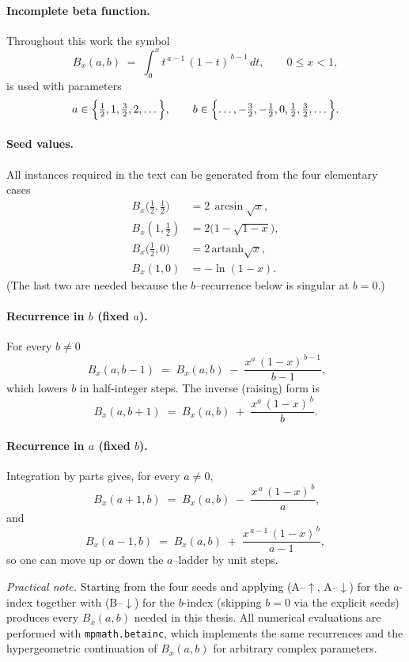 
\paragraph{Incomplete beta function.}
Throughout this work the symbol
\[
  B_x(a,b)\;=\;\int_{0}^{x} t^{\,a-1}\,(1-t)^{\,b-1}\,dt,
  \qquad 0\le x<1,
\]
is used with parameters
\[
  a\in\Bigl\{\tfrac12,1,\tfrac32,2,\dots\Bigr\}, 
  \qquad 
  b\in\Bigl\{\dots,-\tfrac32,-\tfrac12,0,\tfrac12,\tfrac32,\dots\Bigr\}.
\]

\paragraph{Seed values.}
All instances required in the text can be generated from the four
elementary cases
\[
\boxed{
  \begin{aligned}
    B_x\!\bigl(\tfrac12,\tfrac12\bigr) &= 2\,\arcsin\!\sqrt{x},\\[4pt]
    B_x(1,\tfrac12)                   &= 2\bigl(1-\sqrt{1-x}\bigr),\\[4pt]
    B_x\!\bigl(\tfrac12,0\bigr)       &= 2\,\mathrm{artanh}\!\sqrt{x},\\[4pt]
    B_x(1,0)                          &= -\ln(1-x).
  \end{aligned}}
\]
(The last two are needed because the $b$–recurrence below is singular
at $b=0$.)

\paragraph{Recurrence in $b$ (fixed $a$).}
For every $b\neq0$
\[
\boxed{\;
  B_x(a,b-1)
  \;=\;
  B_x(a,b)\;-\;\frac{x^{a}\,(1-x)^{\,b-1}}{\,b-1\,}},
\tag{B‐\(\downarrow\)}
\]
which lowers $b$ in half-integer steps.
The inverse (raising) form is
\[
B_x(a,b+1)
  \;=\;
  B_x(a,b)\;+\;\frac{x^{a}\,(1-x)^{\,b}}{b}.
\tag{B‐\(\uparrow\)}
\]

\paragraph{Recurrence in $a$ (fixed $b$).}
Integration by parts gives, for every $a\neq0$,
\[
\boxed{\;
  B_x(a+1,b)
  \;=\;
  B_x(a,b)\;-\;\frac{x^{\,a}\,(1-x)^{\,b}}{a}},
\tag{A‐\(\uparrow\)}
\]
and
\[
B_x(a-1,b)
  \;=\;
  B_x(a,b)\;+\;\frac{x^{\,a-1}\,(1-x)^{\,b}}{a-1},
\tag{A‐\(\downarrow\)}
\]
so one can move up or down the $a$–ladder by unit steps.

\medskip
\emph{Practical note.}  
Starting from the four seeds and applying
(A–\(\uparrow\), A–\(\downarrow\)) for the \(a\)-index together with
(B–\(\downarrow\)) for the \(b\)-index (skipping \(b=0\) via the
explicit seeds) produces every
\(B_x(a,b)\) needed in this thesis.
All numerical evaluations are performed with \texttt{mpmath.betainc},
which implements the same recurrences and the hypergeometric
continuation of \(B_x(a,b)\) for arbitrary complex parameters.
